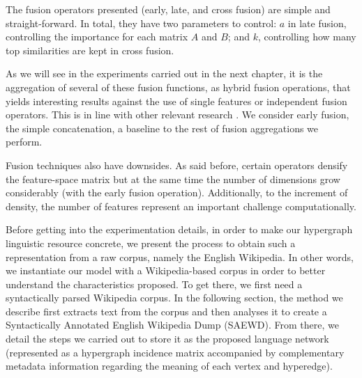 \begin{enumerate}
	\end{enumerate}   


The fusion operators presented (early, late, and cross fusion) are simple and straight-forward. In total, they have two parameters to control: $a$ in late fusion, controlling the importance for each matrix $A$ and $B$; and $k$, controlling how many top similarities are kept in cross fusion.

As we will see in the experiments carried out in the next chapter, it is the aggregation of several of these fusion functions, as hybrid fusion operations, that yields interesting results against the use of single features or independent fusion operators. This is in line with other relevant research \cite{Ah-PineCC15}. We consider early fusion, the simple concatenation, a baseline to the rest of fusion aggregations we perform. 

Fusion techniques also have downsides. As said before, certain  operators densify the feature-space matrix but at the same time the number of dimensions grow considerably (with the early fusion operation). Additionally, to the increment of density, the number of features represent an important challenge computationally. 

Before getting into the experimentation details, in order to make our hypergraph linguistic resource concrete, we present the process to obtain such a representation from a raw corpus, namely the English Wikipedia. In other words, we instantiate our model with a Wikipedia-based corpus in order to better understand the characteristics proposed. To get there, we first need a syntactically parsed Wikipedia corpus. In the following section, the method we describe first extracts text from the corpus and then analyses it to create a Syntactically Annotated English Wikipedia Dump (SAEWD). From there, we detail the steps we carried out to store it as the proposed language network (represented as a hypergraph incidence matrix accompanied by complementary metadata information regarding the meaning of each vertex and hyperedge). 




